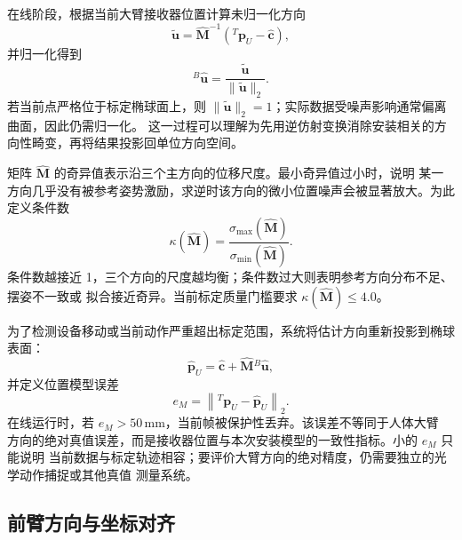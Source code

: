 在线阶段，根据当前大臂接收器位置计算未归一化方向
\begin{equation}
  \tilde{\boldsymbol u}=
  \hat{\boldsymbol M}^{-1}
  ({}^{T}\boldsymbol p_U-\hat{\boldsymbol c}),
  \label{eq:ch4_upper_direction_raw}
\end{equation}
并归一化得到
\begin{equation}
  {}^{B}\hat{\boldsymbol u}=
  \frac{\tilde{\boldsymbol u}}
  {\lVert\tilde{\boldsymbol u}\rVert_2}.
  \label{eq:ch4_upper_direction_normalized}
\end{equation}
若当前点严格位于标定椭球面上，则
$\lVert\tilde{\boldsymbol u}\rVert_2=1$；实际数据受噪声影响通常偏离曲面，因此仍需归一化。
这一过程可以理解为先用逆仿射变换消除安装相关的方向性畸变，再将结果投影回单位方向空间。

矩阵 $\hat{\boldsymbol M}$ 的奇异值表示沿三个主方向的位移尺度。最小奇异值过小时，说明
某一方向几乎没有被参考姿势激励，求逆时该方向的微小位置噪声会被显著放大。为此定义条件数
\begin{equation}
  \kappa(\hat{\boldsymbol M})=
  \frac{\sigma_{\max}(\hat{\boldsymbol M})}
       {\sigma_{\min}(\hat{\boldsymbol M})}.
  \label{eq:ch4_affine_condition_number}
\end{equation}
条件数越接近 1，三个方向的尺度越均衡；条件数过大则表明参考方向分布不足、摆姿不一致或
拟合接近奇异。当前标定质量门槛要求 $\kappa(\hat{\boldsymbol M})\leq4.0$。

为了检测设备移动或当前动作严重超出标定范围，系统将估计方向重新投影到椭球表面：
\begin{equation}
  \hat{\boldsymbol p}_U=
  \hat{\boldsymbol c}+
  \hat{\boldsymbol M}{}^{B}\hat{\boldsymbol u},
  \label{eq:ch4_upper_position_reprojection}
\end{equation}
并定义位置模型误差
\begin{equation}
  e_M=\left\|{}^{T}\boldsymbol p_U-
  \hat{\boldsymbol p}_U\right\|_2.
  \label{eq:ch4_upper_model_error}
\end{equation}
在线运行时，若 $e_M>50\,\mathrm{mm}$，当前帧被保护性丢弃。该误差不等同于人体大臂
方向的绝对真值误差，而是接收器位置与本次安装模型的一致性指标。小的 $e_M$ 只能说明
当前数据与标定轨迹相容；要评价大臂方向的绝对精度，仍需要独立的光学动作捕捉或其他真值
测量系统。

\subsection{前臂方向与坐标对齐}
\label{subsec:ch4_forearm_direction_alignment}

